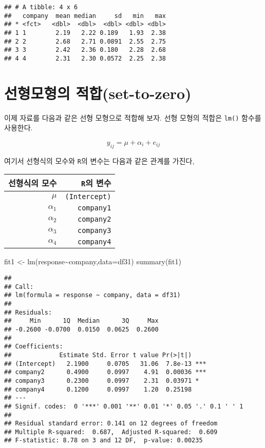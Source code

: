 \documentclass[
]{book}
\newenvironment{Shaded}{\begin{snugshade}}{\end{snugshade}}
\newcommand{\AttributeTok}[1]{\textcolor[rgb]{0.77,0.63,0.00}{#1}}
\newcommand{\FunctionTok}[1]{\textcolor[rgb]{0.00,0.00,0.00}{#1}}
\newcommand{\NormalTok}[1]{#1}
\newcommand{\OtherTok}[1]{\textcolor[rgb]{0.56,0.35,0.01}{#1}}
\newcommand{\SpecialCharTok}[1]{\textcolor[rgb]{0.00,0.00,0.00}{#1}}
\begin{document}
\begin{verbatim}
## # A tibble: 4 x 6
##   company  mean median     sd   min   max
## * <fct>   <dbl>  <dbl>  <dbl> <dbl> <dbl>
## 1 1        2.19   2.22 0.189   1.93  2.38
## 2 2        2.68   2.71 0.0891  2.55  2.75
## 3 3        2.42   2.36 0.180   2.28  2.68
## 4 4        2.31   2.30 0.0572  2.25  2.38
\end{verbatim}

\hypertarget{uxc120uxd615uxbaa8uxd615uxc758-uxc801uxd569set-to-zero}{%
\section{선형모형의 적합(set-to-zero)}\label{uxc120uxd615uxbaa8uxd615uxc758-uxc801uxd569set-to-zero}}

이제 자료를 다음과 같은 선형 모형으로 적합해 보자. 선형 모형의 적합은
\texttt{lm()} 함수를 사용한다.

\[ y_{ij} = \mu + \alpha_i + e_{ij}  \]

여기서 선형식의 모수와 \texttt{R}의 변수는 다음과 같은 관계를 가진다,

\begin{longtable}[]{@{}rr@{}}
\toprule
선형식의 모수 & \texttt{R}의 변수\tabularnewline
\midrule
\endhead
\(\mu\) & \texttt{(Intercept)}\tabularnewline
\(\alpha_1\) & \texttt{company1}\tabularnewline
\(\alpha_2\) & \texttt{company2}\tabularnewline
\(\alpha_3\) & \texttt{company3}\tabularnewline
\(\alpha_4\) & \texttt{company4}\tabularnewline
\bottomrule
\end{longtable}

\begin{Shaded}
\begin{Highlighting}[]
\NormalTok{fit1 }\OtherTok{\textless{}{-}} \FunctionTok{lm}\NormalTok{(response}\SpecialCharTok{\textasciitilde{}}\NormalTok{company,}\AttributeTok{data=}\NormalTok{df31)}
\FunctionTok{summary}\NormalTok{(fit1)}
\end{Highlighting}
\end{Shaded}

\begin{verbatim}
## 
## Call:
## lm(formula = response ~ company, data = df31)
## 
## Residuals:
##     Min      1Q  Median      3Q     Max 
## -0.2600 -0.0700  0.0150  0.0625  0.2600 
## 
## Coefficients:
##             Estimate Std. Error t value Pr(>|t|)    
## (Intercept)   2.1900     0.0705   31.06  7.8e-13 ***
## company2      0.4900     0.0997    4.91  0.00036 ***
## company3      0.2300     0.0997    2.31  0.03971 *  
## company4      0.1200     0.0997    1.20  0.25198    
## ---
## Signif. codes:  0 '***' 0.001 '**' 0.01 '*' 0.05 '.' 0.1 ' ' 1
## 
## Residual standard error: 0.141 on 12 degrees of freedom
## Multiple R-squared:  0.687,  Adjusted R-squared:  0.609 
## F-statistic: 8.78 on 3 and 12 DF,  p-value: 0.00235
\end{verbatim}
\end{document}
